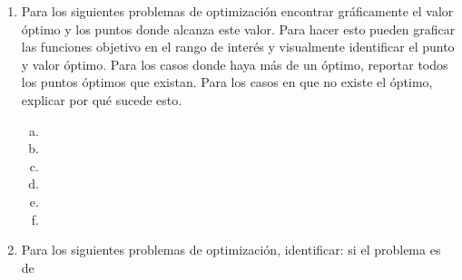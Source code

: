\documentclass[12pt]{article}
\begin{document}
\begin{center}
\begin{enumerate}
                \item Para los siguientes problemas de optimización encontrar gráficamente el valor óptimo y los puntos donde alcanza este valor.
                Para hacer esto pueden graficar las funciones objetivo en el
                rango de interés y visualmente
                identificar el punto y valor óptimo. 
                Para los casos donde haya más de un óptimo, reportar todos los puntos óptimos que existan. Para los casos en que no existe el óptimo, explicar por qué sucede esto.
                \begin{enumerate}[a)]
                    \item 
                    \item  
                    \item 
                    \item 
                    \item 
                    \item 
                \end{enumerate}
            \item Para los siguientes problemas de optimización, identificar: si el problema es de

\end{enumerate}
\end{center}
\end{document}
